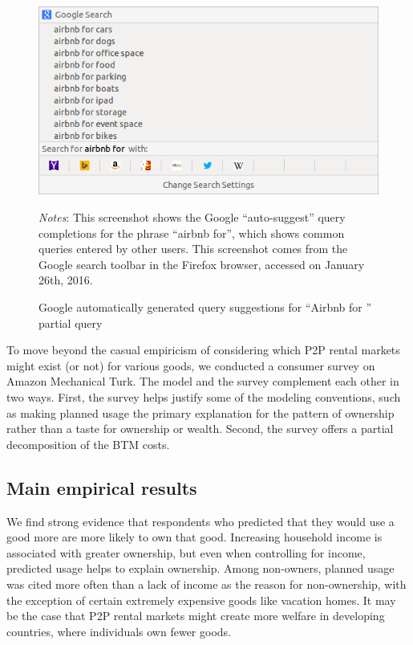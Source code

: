 \documentclass[12pt]{article}
\begin{document}
\begin{figure}
\centering 
\caption{Google automatically generated query suggestions for ``Airbnb for '' partial query}
\label{fig:auto} 
\begin{minipage}{0.70 \linewidth}
  \includegraphics[width = \linewidth]{./images/airbnb_for_x.png} \\
  \begin{footnotesize}
  \emph{Notes}: This screenshot shows the Google ``auto-suggest'' query completions for the phrase ``airbnb for'', which shows common queries entered by other users.
  This screenshot comes from the Google search toolbar in the Firefox browser, accessed on January 26th, 2016.
  \end{footnotesize}
\end{minipage}
\end{figure} 

To move beyond the casual empiricism of considering which P2P rental markets might exist (or not) for various goods, we conducted a consumer survey on Amazon Mechanical Turk. 
The model and the survey complement each other in two ways. 
First, the survey helps justify some of the modeling conventions, such as making planned usage the primary explanation for the pattern of ownership rather than a taste for ownership or wealth. 
Second, the survey offers a partial decomposition of the BTM costs. 

\subsection{Main empirical results}
We find strong evidence that respondents who predicted that they would use a good more are more likely to own that good.
Increasing household income is associated with greater ownership, but even when controlling for income, predicted usage helps to explain ownership. 
Among non-owners, planned usage was cited more often than a lack of income as the reason for non-ownership, with the exception of certain extremely expensive goods like vacation homes.
It may be the case that P2P rental markets might create more welfare in developing countries, where individuals own fewer goods. 
\end{document}
